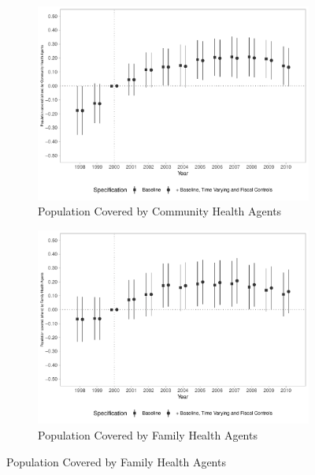\begin{figure}[h!]
    \begin{center}
    \caption{Effects on Primary Care Coverage - Extensive Margin}\label{fig:11}
    \begin{subfigure}{0.48\textwidth}
        \centering
        \caption{\scriptsize Population Covered by Community Health Agents}\label{fig:11a}
        \includegraphics[width=\textwidth]{plots/ACS_popprop_dist_ec29_baseline_dist_ec29_baseline_11.pdf}
    \end{subfigure}
    \begin{subfigure}{0.48\textwidth}
        \centering
        \caption{\scriptsize Population Covered by Family Health Agents}\label{fig:1b}
        \includegraphics[width=\textwidth]{plots/eSF_popprop_dist_ec29_baseline_dist_ec29_baseline_11.pdf}
    \end{subfigure}
    

\end{center}
\end{figure}
